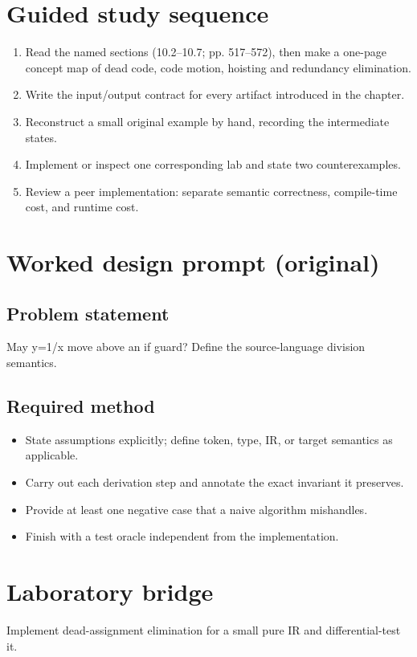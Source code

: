 \documentclass[10pt,letterpaper]{article}
\begin{document}
\section{Guided study sequence}
\begin{enumerate}
\item Read the named sections (10.2--10.7; pp. 517--572), then make a one-page concept map of dead code, code motion, hoisting and redundancy elimination.
\item Write the input/output contract for every artifact introduced in the chapter.
\item Reconstruct a small original example by hand, recording the intermediate states.
\item Implement or inspect one corresponding lab and state two counterexamples.
\item Review a peer implementation: separate semantic correctness, compile-time cost, and runtime cost.
\end{enumerate}

\section{Worked design prompt (original)}
\subsection{Problem statement}
May y=1/x move above an if guard? Define the source-language division semantics.
\subsection{Required method}
\begin{itemize}
\item State assumptions explicitly; define token, type, IR, or target semantics as applicable.
\item Carry out each derivation step and annotate the exact invariant it preserves.
\item Provide at least one negative case that a naive algorithm mishandles.
\item Finish with a test oracle independent from the implementation.
\end{itemize}


\section{Laboratory bridge}
Implement dead-assignment elimination for a small pure IR and differential-test it.
\end{document}
